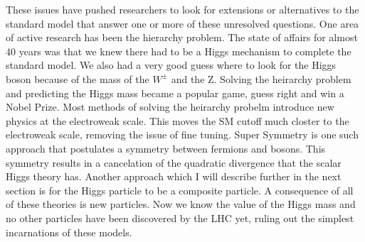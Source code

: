 These issues have pushed researchers to look for extensions or alternatives to the standard model that answer one or more of these unresolved questions.
One area of active research has been the hierarchy problem.
The state of affairs for almost 40 years was that we knew there had to be a Higgs mechanism to complete the standard model.
We also had a very good guess where to look for the Higgs boson because of the mass of the $W^{\pm}$ and the Z.
Solving the heirarchy problem and predicting the Higgs mass became a popular game, guess right and win a Nobel Prize.
Most methods of solving the heirarchy probelm introduce new physics at the electroweak scale.
This moves the SM cutoff much closter to the electroweak scale, removing the issue of fine tuning.
Super Symmetry is one such approach that postulates a symmetry between fermions and bosons.
This symmetry results in a cancelation of the quadratic divergence that the scalar Higgs theory has.
Another approach which I will describe further in the next section is for the Higgs particle to be a composite particle.
A consequence of all of these theories is new particles.
Now we know the value of the Higgs mass and no other particles have been discovered by the LHC yet, ruling out the simplest incarnations of these models.
